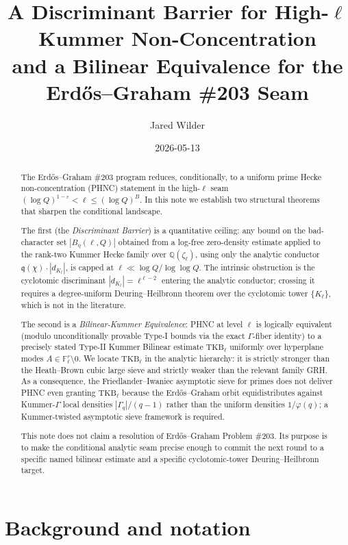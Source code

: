 \documentclass[11pt]{article}
\title{A Discriminant Barrier for High-$\ell$ Kummer Non-Concentration\\
and a Bilinear Equivalence for the Erd\H{o}s--Graham \#203 Seam}
\author{Jared Wilder}
\date{2026-05-13}
\newcommand{\Q}{\mathbb Q}
\newcommand{\F}{\mathbb F}
\newcommand{\1}{\mathbf 1}
\begin{document}
\maketitle

\begin{abstract}
The Erd\H{o}s--Graham \#203 program reduces, conditionally, to a uniform prime Hecke non-concentration (PHNC) statement in the high-\(\ell\) seam \((\log Q)^{1-\varepsilon}<\ell\le(\log Q)^B\).  In this note we establish two structural theorems that sharpen the conditional landscape.

The first (the \emph{Discriminant Barrier}) is a quantitative ceiling: any bound on the bad-character set \(|B_\eta(\ell,Q)|\) obtained from a log-free zero-density estimate applied to the rank-two Kummer Hecke family over \(\Q(\zeta_\ell)\), using only the analytic conductor \(\mathfrak q(\chi)\cdot|d_{K_\ell}|\), is capped at \(\ell\ll\log Q/\log\log Q\).  The intrinsic obstruction is the cyclotomic discriminant \(|d_{K_\ell}|=\ell^{\ell-2}\) entering the analytic conductor; crossing it requires a degree-uniform Deuring--Heilbronn theorem over the cyclotomic tower \(\{K_\ell\}\), which is not in the literature.

The second is a \emph{Bilinear-Kummer Equivalence}: PHNC at level \(\ell\) is logically equivalent (modulo unconditionally provable Type-I bounds via the exact \(\Gamma\)-fiber identity) to a precisely stated Type-II Kummer Bilinear estimate \(\mathrm{TKB}_\ell\) uniformly over hyperplane modes \(A\in\F_\ell^r\setminus 0\).  We locate \(\mathrm{TKB}_\ell\) in the analytic hierarchy: it is strictly stronger than the Heath--Brown cubic large sieve and strictly weaker than the relevant family GRH.  As a consequence, the Friedlander--Iwaniec asymptotic sieve for primes does not deliver PHNC even granting \(\mathrm{TKB}_\ell\) because the Erd\H{o}s--Graham orbit equidistributes against Kummer-\(\Gamma\) local densities \(|\Gamma_q|/(q-1)\) rather than the uniform densities \(1/\varphi(q)\); a Kummer-twisted asymptotic sieve framework is required.

This note does not claim a resolution of Erd\H{o}s--Graham Problem \#203.  Its purpose is to make the conditional analytic seam precise enough to commit the next round to a specific named bilinear estimate and a specific cyclotomic-tower Deuring--Heilbronn target.
\end{abstract}

\section{Background and notation}
\end{document}
